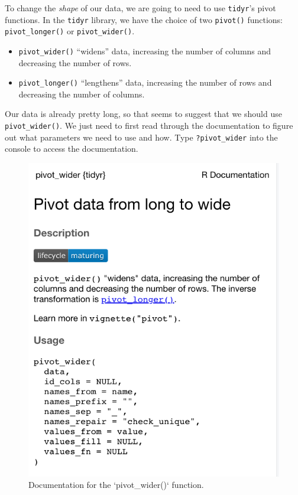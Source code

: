 \documentclass[
]{book}
\providecommand{\tightlist}{%
  \setlength{\itemsep}{0pt}\setlength{\parskip}{0pt}}
\begin{document}
To change the \emph{shape} of our data, we are going to need to use \texttt{tidyr}'s pivot functions. In the \texttt{tidyr} library, we have the choice of two \texttt{pivot()} functions: \texttt{pivot\_longer()} or \texttt{pivot\_wider()}.

\begin{itemize}
\tightlist
\item
  \texttt{pivot\_wider()} ``widens'' data, increasing the number of columns and decreasing the number of rows.
\item
  \texttt{pivot\_longer()} ``lengthens'' data, increasing the number of rows and decreasing the number of columns.
\end{itemize}

Our data is already pretty long, so that seems to suggest that we should use \texttt{pivot\_wider()}. We just need to first read through the documentation to figure out what parameters we need to use and how. Type \texttt{?pivot\_wider} into the console to access the documentation.

\begin{figure}

{\centering \includegraphics[width=0.9\linewidth]{images/w05/pivot_wider} 

}

\caption{Documentation for the `pivot_wider()` function.}\label{fig:05-pivot-wider}
\end{figure}
\end{document}
